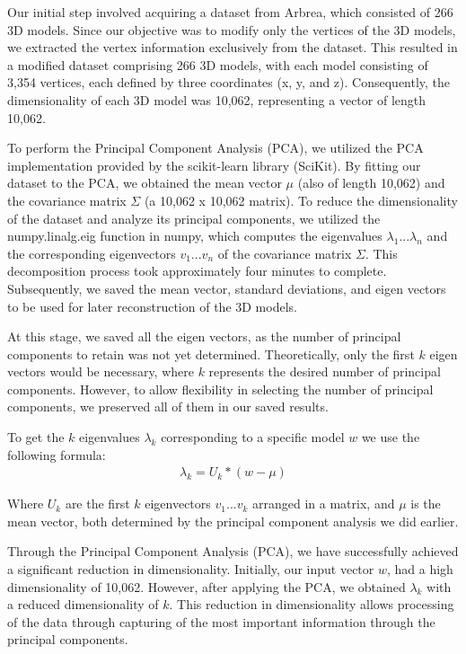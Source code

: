 Our initial step involved acquiring a dataset from Arbrea, which consisted of 266 3D models. Since our objective was to modify only the vertices of the 3D models, we extracted the 
vertex information exclusively from the dataset. This resulted in a modified dataset comprising 266 3D models, with each model consisting of 3,354 vertices, each defined by three coordinates (x, y, and z). 
Consequently, the dimensionality of each 3D model was 10,062, representing a vector of length 10,062.

To perform the Principal Component Analysis (PCA), we utilized the PCA implementation provided by the scikit-learn library (SciKit). By fitting our dataset to the PCA, 
we obtained the mean vector $\mu$ (also of length 10,062) and the covariance matrix $\Sigma$ (a 10,062 x 10,062 matrix). To reduce the dimensionality of the dataset and analyze its principal components, 
we utilized the numpy.linalg.eig function in numpy, which computes the eigenvalues $\lambda_1...\lambda_n$ and the corresponding eigenvectors $v_1...v_n$ of the covariance matrix $\Sigma$. This decomposition process took approximately four minutes to complete. 
Subsequently, we saved the mean vector, standard deviations, and eigen vectors to be used for later reconstruction of the 3D models.

At this stage, we saved all the eigen vectors, as the number of principal components to retain was not yet determined. Theoretically, only the first $k$ eigen vectors would be necessary, 
where $k$ represents the desired number of principal components. However, to allow flexibility in selecting the number of principal components, we preserved all of them in our saved results.

To get the $k$ eigenvalues $\lambda_k$ corresponding to a specific model $w$ we use the following formula: 
\begin{align}\label{eq:lambda_k}
    \lambda_k = U_k * (w - \mu)
\end{align}

Where $U_k$ are the first $k$ eigenvectors $v_1...v_k$ arranged in a matrix, and $\mu$ is the mean vector, both determined by the principal component analysis we did earlier. 

Through the Principal Component Analysis (PCA), we have successfully achieved a significant reduction in dimensionality. Initially, our input vector $w$, had a high dimensionality of 10,062. 
However, after applying the PCA, we obtained $\lambda_k$ with a reduced dimensionality of $k$. This reduction in dimensionality allows processing of the data through capturing of the most important 
information through the principal components.

